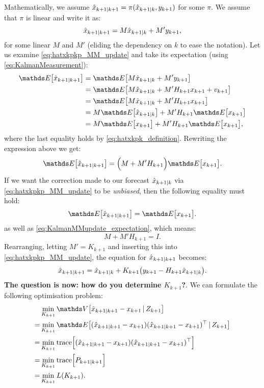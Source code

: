 Mathematically, we assume $\hat{x}_{k+1|k+1} = \pi (\hat{x}_{k+1|k}, y_{k+1})$ for some $\pi$. We assume that $\pi$
is linear and write it as:
\begin{equation}\label{eq:hatxkpkp_MM_update}
\hat{x}_{k+1|k+1} = M \hat{x}_{k+1|k} + M' y_{k+1},
\end{equation}
for some linear $M$ and $M'$ (eliding the dependency on $k$ to ease the notation). Let us examine
\eqref{eq:hatxkpkp_MM_update} and take its expectation (using \eqref{eq:KalmanMeasurement}):
\begin{align*}
\expect{\hatxkpkp} & = \expect{M \hatxkpk + M' \ykp}\\
& = \expect{M\hatxkpk + M'  H_{k+1} \xkp + v_{k+1}}\\
& = \expect{M\hatxkpk + M'  H_{k+1} \xkp}\\
& = M\expect{\hatxkpk} + M'  H_{k+1} \expect{\xkp}\\
& = M\expect{\xkp} + M'  H_{k+1} \expect{\xkp},
\end{align*}
where the last equality holds by \eqref{eq:hatxkpk_definition}. Rewriting the expression
above we get:
\begin{equation}\label{eq:KalmanMMupdate_expectation}
\expect{\hatxkpkp} = \Big(M + M'  H_{k+1}\Big) \expect{\xkp}.    
\end{equation}
If we want the correction made to our forecast $\hat{x}_{k+1|k}$ via \eqref{eq:hatxkpkp_MM_update} to be  
\emph{unbiased}, then the following equality  must hold:
\[
\expect{\hatxkpkp} = \expect{\xkp}.
\]
as well as \eqref{eq:KalmanMMupdate_expectation}, which means:
\[
M + M'  H_{k+1} = I.
\]
Rearranging, letting $M'=K_{k+1}$ and inserting this into \eqref{eq:hatxkpkp_MM_update}, the 
equation for $\hat{x}_{k+1|k+1}$ becomes:
\begin{equation}\label{eq:hatxkpkp_final}
\hat{x}_{k+1|k+1} = \hat{x}_{k+1|k} + K_{k+1} \big(y_{k+1} - H_{k+1} \hat{x}_{k+1|k} \big).
\end{equation}
\textbf{The question is now: how do you determine $K_{k+1}$?}. We can formulate the following
optimisation problem:
\begin{align*}
& \min_{K_{k+1}} \covariance{\hatxkpkp - \xkp\given Z_{k+1}}\\
= & \min_{K_{k+1}} \expect{(\hatxkpkp - \xkp)(\hatxkpkp - \xkp)\transp\given Z_{k+1}}\\
= & \min_{K_{k+1}} \trace{(\hatxkpkp - \xkp)(\hatxkpkp - \xkp)\transp}\\
= & \min_{K_{k+1}} \trace{\Pkpkp}\\
= & \min_{K_{k+1}} L(K_{k+1}).
\end{align*}

